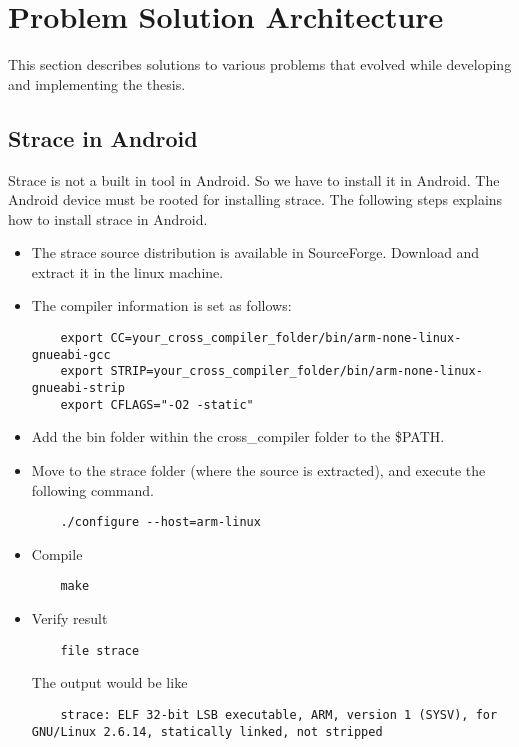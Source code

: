 \section{Problem Solution Architecture}\label{problem}
This section describes solutions to various problems that evolved while developing and implementing the thesis.

\subsection{Strace in Android}
Strace is not a built in tool in Android. So we have to install it in Android. The Android device must be rooted for installing strace. The following steps explains how to install strace in Android.
\begin{itemize}
	\item The strace source distribution is available in SourceForge. Download and extract it in the linux machine.
	\item The compiler information is set as follows:
	\begin{lstlisting}
	export CC=your_cross_compiler_folder/bin/arm-none-linux-gnueabi-gcc
	export STRIP=your_cross_compiler_folder/bin/arm-none-linux-gnueabi-strip
	export CFLAGS="-O2 -static"
	\end{lstlisting}
	
	\item Add the bin folder within the cross\_compiler folder to the \$PATH.
	\item Move to the strace folder (where the source is extracted), and execute the following command.
	
	\begin{lstlisting}
	./configure --host=arm-linux
	\end{lstlisting}
	
	\item Compile
	\begin{lstlisting}
	make
	\end{lstlisting}
	\item Verify result
	\begin{lstlisting}
	file strace
	\end{lstlisting}
	The output would be like
	\begin{lstlisting}
	strace: ELF 32-bit LSB executable, ARM, version 1 (SYSV), for GNU/Linux 2.6.14, statically linked, not stripped
	\end{lstlisting}
\end{itemize}

